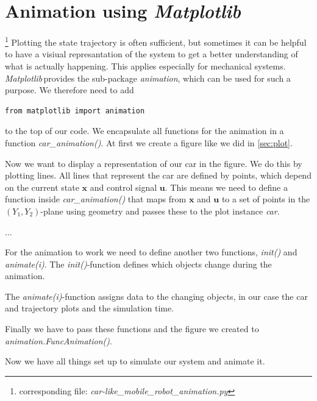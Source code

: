 \documentclass[a4paper,11pt,headings=standardclasses]{scrartcl}%
\newcommand{\mpl}{\emph{Matplotlib}\,}
\newcommand{\uu}{\mathbf{u}}
\newcommand{\x}{\mathbf{x}}
\begin{document}
\section{Animation using \mpl}
\label{sec:animation}
\footnote{corresponding file: \emph{car-like\_mobile\_robot\_animation.py}}
Plotting the state trajectory is often sufficient, but sometimes it can be helpful to have a visiual represantation of the system to get a better understanding of what is actually happening. This applies especially for mechanical systems.
\mpl provides the sub-package \emph{animation}, which can be used for such a purpose. We therefore need to add 
\begin{lstlisting}
from matplotlib import animation
\end{lstlisting}
to the top of our code. We encapsulate all functions for the animation in a function \emph{car\_animation()}. At first we create a figure like we did in \ref{sec:plot}.

Now we want to display a representation of our car in the figure. We do this by plotting lines. All lines that represent the car are defined by points, which depend on the current state $\x$ and control signal $\uu$. This means we need to define a function inside \emph{car\_animation()} that maps from $\x$ and $\uu$ to a set of points in the $(Y_1,Y_2)$-plane using geometry and passes these to the plot instance \emph{car}.

$\dots$

For the animation to work we need to define another two functions, \emph{init()} and \emph{animate(i)}. The \emph{init()}-function defines which objects change during the animation.

The \emph{animate(i)}-function assigns data to the changing objects, in our case the car and trajectory plots and the simulation time.

Finally we have to pass these functions and the figure we created to \emph{animation.FuncAnimation()}.

Now we have all things set up to simulate our system and animate it.

\end{document}
